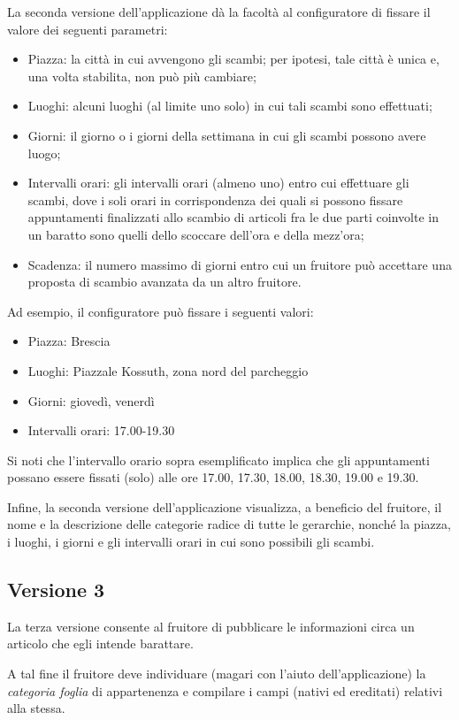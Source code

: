 La seconda versione dell’applicazione dà la facoltà al configuratore di fissare il valore dei seguenti parametri:
\begin{itemize}
    \item Piazza: la città in cui avvengono gli scambi; per ipotesi, tale città è unica e, una volta stabilita, non può più cambiare;
    \item Luoghi: alcuni luoghi (al limite uno solo) in cui tali scambi sono effettuati;
    \item Giorni: il giorno o i giorni della settimana in cui gli scambi possono avere luogo;
    \item Intervalli orari: gli intervalli orari (almeno uno) entro cui effettuare gli scambi, dove i soli orari in corrispondenza dei quali si possono fissare appuntamenti finalizzati allo scambio di articoli fra le due parti coinvolte in un baratto sono quelli dello scoccare dell’ora e della mezz’ora;
    \item Scadenza: il numero massimo di giorni entro cui un fruitore può accettare una proposta di scambio avanzata da un altro fruitore.
\end{itemize}
Ad esempio, il configuratore può fissare i seguenti valori:
\begin{itemize}
    \item Piazza: Brescia
    \item Luoghi: Piazzale Kossuth, zona nord del parcheggio
    \item Giorni: giovedì, venerdì
    \item Intervalli orari: 17.00-19.30
\end{itemize}
Si noti che l’intervallo orario sopra esemplificato implica che gli appuntamenti possano essere fissati (solo) alle ore 17.00, 17.30, 18.00, 18.30, 19.00 e 19.30.\newline

Infine, la seconda versione dell’applicazione visualizza, a beneficio del fruitore, il nome e la descrizione delle categorie radice di tutte le gerarchie, nonché la piazza, i luoghi, i giorni e gli intervalli orari in cui sono possibili gli scambi.

\subsection{Versione 3}
La terza versione consente al fruitore di pubblicare le informazioni circa un articolo che egli intende barattare.

A tal fine il fruitore deve individuare (magari con l’aiuto dell’applicazione) la \textit{categoria foglia} di appartenenza e compilare i campi (nativi ed ereditati) relativi alla stessa. 

